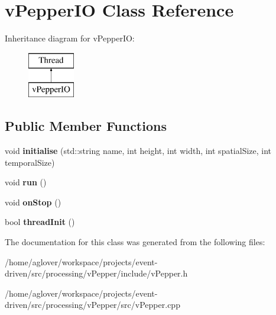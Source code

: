 \hypertarget{classvPepperIO}{}\section{v\+Pepper\+IO Class Reference}
\label{classvPepperIO}
Inheritance diagram for v\+Pepper\+IO\+:\begin{figure}[H]
\begin{center}
\leavevmode
\includegraphics[height=2.000000cm]{classvPepperIO}
\end{center}
\end{figure}
\subsection*{Public Member Functions}
\begin{DoxyCompactItemize}
\item 
void {\bfseries initialise} (std\+::string name, int height, int width, int spatial\+Size, int temporal\+Size)\hypertarget{classvPepperIO_a14c1008fa51800700f00828474125044}{}\label{classvPepperIO_a14c1008fa51800700f00828474125044}

\item 
void {\bfseries run} ()\hypertarget{classvPepperIO_a625e494ecb083b3055533b953a8ca89c}{}\label{classvPepperIO_a625e494ecb083b3055533b953a8ca89c}

\item 
void {\bfseries on\+Stop} ()\hypertarget{classvPepperIO_ae54b4273e42361ad9cc515b47be0cb54}{}\label{classvPepperIO_ae54b4273e42361ad9cc515b47be0cb54}

\item 
bool {\bfseries thread\+Init} ()\hypertarget{classvPepperIO_a3bf3d088a10210d806fc4f0f0b9043a7}{}\label{classvPepperIO_a3bf3d088a10210d806fc4f0f0b9043a7}

\end{DoxyCompactItemize}


The documentation for this class was generated from the following files\+:\begin{DoxyCompactItemize}
\item 
/home/aglover/workspace/projects/event-\/driven/src/processing/v\+Pepper/include/v\+Pepper.\+h\item 
/home/aglover/workspace/projects/event-\/driven/src/processing/v\+Pepper/src/v\+Pepper.\+cpp\end{DoxyCompactItemize}
